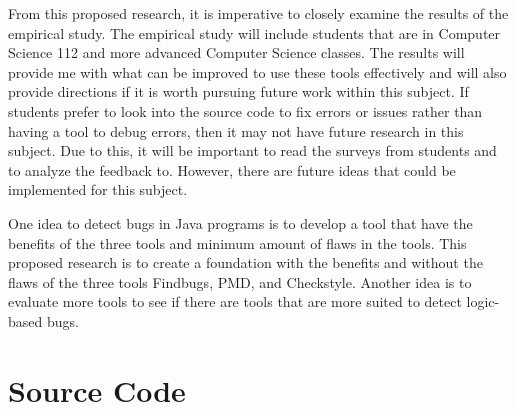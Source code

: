 From this proposed research, it is imperative to closely examine the results of the empirical study. The empirical study will include students that are in Computer Science 112 and more advanced Computer Science classes. The results will provide me with what can be improved to use these  tools effectively and will also provide directions if it is worth pursuing  future work within this subject. If students prefer to look into the source code to fix errors or issues rather than having a tool to debug errors, then it may not have future research in this subject. Due to this, it will be important to read the surveys from students and to analyze the feedback to. However, there are future ideas that could be implemented for this subject. 

One idea to detect bugs in Java programs is to develop a tool that have the benefits of the three tools and minimum amount of flaws in the tools. This proposed research is to create a foundation with the benefits and without the flaws of the three tools Findbugs, PMD, and Checkstyle. Another idea is to evaluate more tools to see if there are tools that are more suited to detect logic-based bugs.

\newpage
\vspace*{-.1in}
\section{Source Code}
\label{sec: source code}
\vspace*{-.1in}



